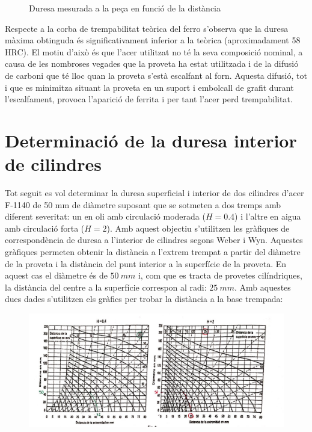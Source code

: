 \documentclass[a4paper]{report}
\begin{document}
\begin{figure}[H]
	\centering
	\caption{Duresa mesurada a la peça en funció de la distància}
\end{figure}

Respecte a la corba de trempabilitat teòrica del ferro s'observa que la duresa màxima obtinguda és significativament inferior a la teòrica (aproximadament 58 HRC). El motiu d'això és que l'acer utilitzat no té la seva composició nominal, a causa de les nombroses vegades que la proveta ha estat utilitzada i de la difusió de carboni que té lloc quan la proveta s'està escalfant al forn. Aquesta difusió, tot i que  es minimitza situant la proveta en un suport i embolcall de grafit durant l'escalfament, provoca l'aparició de ferrita i per tant l'acer perd trempabilitat.

\section{Determinació de la duresa interior de cilindres}
Tot seguit es vol determinar la duresa superficial i interior de dos cilindres d'acer F-1140 de 50 mm de diàmetre suposant que se sotmeten a dos tremps amb diferent severitat: un en oli amb circulació moderada ($H=0.4$) i l'altre en aigua amb circulació forta ($H=2$). Amb aquest objectiu s'utilitzen les gràfiques de correspondència de duresa a l'interior de cilindres segons Weber i Wyn. Aquestes gràfiques permeten obtenir la distància a l'extrem trempat a partir del diàmetre de la proveta i la distància del punt interior a la superfície de la proveta. En aquest cas el diàmetre és de $50\ mm$ i, com que es tracta de provetes cilíndriques, la distància del centre a la superfície correspon al radi: $25\ mm$. Amb aquestes dues dades s'utilitzen els gràfics per trobar la distància a la base trempada:

\begin{figure}[H]
	\centering
	\includegraphics[width=\textwidth]{images/jominy/cilindres}
\end{figure}
\end{document}
